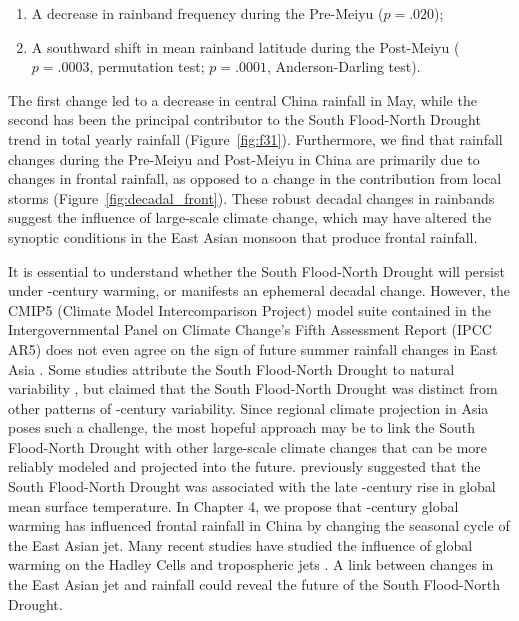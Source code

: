 \documentclass{ametsoc}
\begin{document}
\begin{enumerate} 
\item A decrease in rainband frequency during the Pre-Meiyu ($p=.020$);
\item A southward shift in mean rainband latitude during the Post-Meiyu ($p=.0003$, permutation test; $p=.0001$, Anderson-Darling test). 
\end{enumerate}
	
	The first change led to a decrease in central China rainfall in May, while the second has been the principal contributor to the South Flood-North Drought trend in total yearly rainfall (Figure~\ref{fig:f31}). Furthermore, we find that rainfall changes during the Pre-Meiyu and Post-Meiyu in China are primarily due to changes in frontal rainfall, as opposed to a change in the contribution from local storms (Figure~\ref{fig:decadal_front}). These robust decadal changes in rainbands suggest the influence of large-scale climate change, which may have altered the synoptic conditions in the East Asian monsoon that produce frontal rainfall.
		
	It is essential to understand whether the South Flood-North Drought will persist under -century warming, or manifests an ephemeral decadal change. However, the CMIP5 (Climate Model Intercomparison Project) model suite contained in the Intergovernmental Panel on Climate Change's Fifth Assessment Report (IPCC AR5) does not even agree on the sign of future summer rainfall changes in East Asia \citep{Christensen2011}. Some studies attribute the South Flood-North Drought to natural variability \citep{Zhang1999,Xin2006,Lei2014}, but \citet{Zhou2009} claimed that the South Flood-North Drought was distinct from other patterns of -century variability. Since regional climate projection in Asia poses such a challenge, the most hopeful approach may be to link the South Flood-North Drought with other large-scale climate changes that can be more reliably modeled and projected into the future. \citet{Zhao2010} previously suggested that the South Flood-North Drought was associated with the late -century rise in global mean surface temperature. In Chapter 4, we propose that -century global warming has influenced frontal rainfall in China by changing the seasonal cycle of the East Asian jet. Many recent studies have studied the influence of global warming on the Hadley Cells and tropospheric jets \citep{Frierson2007,Kang2012}. A link between changes in the East Asian jet and rainfall could reveal the future of the South Flood-North Drought.
		
\end{document}
